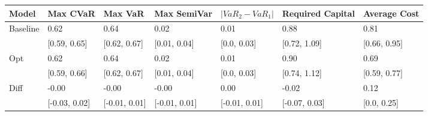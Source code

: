 \begin{tabular}{lllllll}
\toprule
   Model &      Max CVaR &       Max VaR &   Max SemiVar & $|VaR_2 - VaR_1|$ & Required Capital & Average Cost \\
\midrule
Baseline &          0.62 &          0.64 &          0.02 &              0.01 &             0.88 &         0.81 \\
         &  [0.59, 0.65] &  [0.62, 0.67] &  [0.01, 0.04] &       [0.0, 0.03] &     [0.72, 1.09] & [0.66, 0.95] \\
     Opt &          0.62 &          0.64 &          0.02 &              0.01 &             0.90 &         0.69 \\
         &  [0.59, 0.66] &  [0.62, 0.67] &  [0.01, 0.04] &       [0.0, 0.03] &     [0.74, 1.12] & [0.59, 0.77] \\
    Diff &         -0.00 &         -0.00 &         -0.00 &              0.00 &            -0.02 &         0.12 \\
         & [-0.03, 0.02] & [-0.01, 0.01] & [-0.01, 0.01] &     [-0.01, 0.01] &    [-0.07, 0.03] &  [0.0, 0.25] \\
\bottomrule
\end{tabular}
